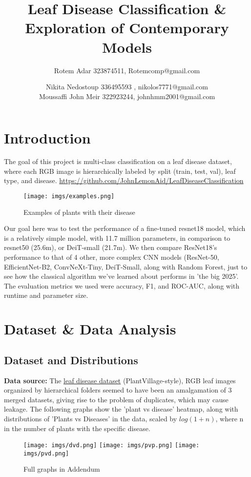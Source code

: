 \documentclass{article}
\title{Leaf Disease Classification & Exploration of Contemporary Models}
\author[ ]{Rotem Adar 323874511, Rotemcomp@gmail.com}
\author[ ]{Nikita Nedostoup 336495593 , nikolos7771@gmail.com\\
Moussaffi John Meir 322923244, johnhmm2001@gmail.com}
\affil[ ]{Bar-Ilan University, Department of Mathematics}
\date{}
\begin{document}
\maketitle

\section{Introduction}
The goal of this project is multi-class classification on a leaf disease dataset, where each RGB image is hierarchically labeled by split (train, test, val), leaf type, and disease. \href{https://github.com/JohnLemonAid/LeafDiseaseClassification}{https://github.com/JohnLemonAid/LeafDiseaseClassification}
\begin{figure}[h!]
    \centering
    \texttt{[image: imgs/examples.png]}
    \caption{Examples of plants with their disease}
    \label{fig:placeholder}
\end{figure}

Our goal here was to test the performance of a fine-tuned resnet18 model, which is a relatively simple model, with 11.7 million parameters, in comparison to resnet50 (25.6m), or DeiT-small (21.7m). We then compare ResNet18's performance to that of 4 other, more complex CNN models (ResNet-50, EfficientNet-B2, ConvNeXt-Tiny, DeiT-Small, along with Random Forest, just to see how the classical algorithm we've learned about performs in 'the big 2025'. 
The evaluation metrics we used were accuracy, F1, and ROC-AUC, along with runtime and parameter size.

\section{Dataset \& Data Analysis}
\subsection{Dataset and Distributions}
\textbf{Data source:} The \href{https://www.kaggle.com/datasets/asheniranga/leaf-disease-dataset-combination}{leaf disease dataset} (PlantVillage-style), RGB leaf images organized by hierarchical folders seemed to have been an amalgamation of 3 merged datasets, giving rise to the problem of duplicates, which may cause leakage.
The following graphs show the 'plant vs disease' heatmap, along with distributions of 'Plants vs Diseases' in the data, scaled by $log(1+n)$, where n in the number of plants with the specific disease.
\begin{figure}[H]
    \centering
    \texttt{[image: imgs/dvd.png]}
    \texttt{[image: imgs/pvp.png]}
    \texttt{[image: imgs/pvd.png]}
    \caption{Full graphs in Addendum}
\end{figure}
\end{document}
